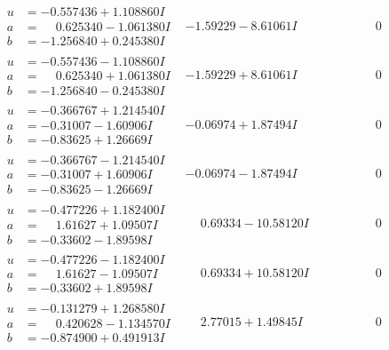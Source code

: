 \documentclass[1p]{elsarticle_modified}
\theoremstyle{definition}
\begin{document}
$$\begin{array}{c|c|c}
\begin{aligned}
u &= -0.557436 + 1.108860 I \\
a &= \phantom{-}0.625340 - 1.061380 I \\
b &= -1.256840 + 0.245380 I\end{aligned}
 & -1.59229 - 8.61061 I & \phantom{-0.000000 } 0 \\ \hline\begin{aligned}
u &= -0.557436 - 1.108860 I \\
a &= \phantom{-}0.625340 + 1.061380 I \\
b &= -1.256840 - 0.245380 I\end{aligned}
 & -1.59229 + 8.61061 I & \phantom{-0.000000 } 0 \\ \hline\begin{aligned}
u &= -0.366767 + 1.214540 I \\
a &= -0.31007 - 1.60906 I \\
b &= -0.83625 + 1.26669 I\end{aligned}
 & -0.06974 + 1.87494 I & \phantom{-0.000000 } 0 \\ \hline\begin{aligned}
u &= -0.366767 - 1.214540 I \\
a &= -0.31007 + 1.60906 I \\
b &= -0.83625 - 1.26669 I\end{aligned}
 & -0.06974 - 1.87494 I & \phantom{-0.000000 } 0 \\ \hline\begin{aligned}
u &= -0.477226 + 1.182400 I \\
a &= \phantom{-}1.61627 + 1.09507 I \\
b &= -0.33602 - 1.89598 I\end{aligned}
 & \phantom{-}0.69334 - 10.58120 I & \phantom{-0.000000 } 0 \\ \hline\begin{aligned}
u &= -0.477226 - 1.182400 I \\
a &= \phantom{-}1.61627 - 1.09507 I \\
b &= -0.33602 + 1.89598 I\end{aligned}
 & \phantom{-}0.69334 + 10.58120 I & \phantom{-0.000000 } 0 \\ \hline\begin{aligned}
u &= -0.131279 + 1.268580 I \\
a &= \phantom{-}0.420628 - 1.134570 I \\
b &= -0.874900 + 0.491913 I\end{aligned}
 & \phantom{-}2.77015 + 1.49845 I & \phantom{-0.000000 } 0 \\ \hline\begin{aligned}

\end{aligned}
\end{array}$$
\end{document}
